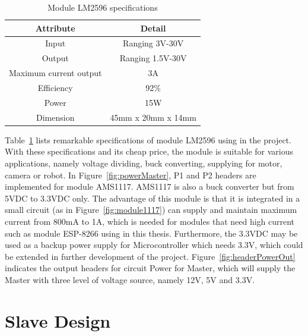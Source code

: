           \begin{table}[h!]
            \begin{center}
            \begin{tabular}{ |c|c|  }
              \hline
              Attribute & Detail\\
              \hline
              Input& Ranging 3V-30V\\
              \hline
              Output&   Ranging 1.5V-30V\\
              \hline
              Maximum current output &3A\\
              \hline
              Efficiency & 92\%\\
              \hline
              Power & 15W\\
              \hline
              Dimension & 45mm x 20mm x 14mm\\
              \hline
             \end{tabular}
             \caption{Module LM2596 specifications}
             \label{table:module2596}
            \end{center}
            \end{table}
            Table~\ref{table:module2596} lists remarkable specifications of module LM2596 using in the project. With these specifications and its cheap price, the module is suitable for various applications, namely voltage dividing, buck converting, supplying for motor, camera or robot.
            In Figure~\ref{fig:powerMaster}, P1 and P2 headers are implemented for module AMS1117. AMS1117 is also a buck converter but from 5VDC to 3.3VDC only. The advantage of this module is that it is integrated in a small circuit (as in Figure~\ref{fig:module1117}) can supply and maintain maximum current from 800mA to 1A, which is needed for modules that need high current such as module ESP-8266 using in this thesis. Furthermore, the 3.3VDC may be used as a backup power supply for Microcontroller which needs 3.3V, which could be extended in further development of the project. Figure~\ref{fig:headerPowerOut} indicates the output headers for circuit Power for Master, which will supply the Master with three level of voltage source, namely 12V, 5V and 3.3V.
            
\section{Slave Design}
